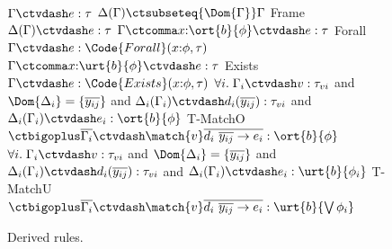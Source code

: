 \begin{figure}[h!]
{    \quad
    \mprooftr{22mm}
    {$\Gamma \ctvdash e : \tau$ \quad $\Delta(\Gamma) \ctsubseteq{\Dom{\Gamma}} \Gamma $}
    {Frame}
    {$\Delta(\Gamma) \ctvdash e : \tau$}
    \quad
    \mprooftr{35mm}
    {$\Gamma \ctcomma x{:}\ort{b}{\phi} \ctvdash e : \tau$}
    {Forall}
    {$\Gamma \ctvdash e : \Code{Forall}(x{:}\phi, \tau)$}
    \\[.8em]
    \mprooftr{35mm}
    {$\Gamma \ctcomma x{:}\urt{b}{\phi} \ctvdash e : \tau$}
    {Exists}
    {$\Gamma \ctvdash e : \Code{Exists}(x{:}\phi, \tau)$}
    \quad
    \mprooftr{65mm}
    {$\forall i.\;\Gamma_i \ctvdash v : \tau_{vi}$  and $\Dom{\Delta_i} = \{\overline{y_{ij}}\}$ and  $\Delta_i(\Gamma_i) \ctvdash d_i(\overline{y_{ij}}) : \tau_{vi}$ and $\Delta_i(\Gamma_i) \ctvdash e_i : \ort{b}{\phi}$ }
      {T-MatchO}
      {$\ctbigoplus \overline{\Gamma_i} \ctvdash \match{v} \overline{d_i\ \overline{y_{ij}} \to e_i}  : \ort{b}{\phi}$}
      \\[.8em]
    \mprooftr{65mm}
      {$\forall i.\;\Gamma_i \ctvdash v : \tau_{vi}$  and $\Dom{\Delta_i} = \{\overline{y_{ij}}\}$ and  $\Delta_i(\Gamma_i) \ctvdash d_i(\overline{y_{ij}}) : \tau_{vi}$ and $\Delta_i(\Gamma_i) \ctvdash e_i : \urt{b}{\phi_i}$ }
      {T-MatchU}
      {$\ctbigoplus \overline{\Gamma_i} \ctvdash \match{v} \overline{d_i\ \overline{y_{ij}} \to e_i}  : \urt{b}{\bigvee \phi_i}$}
    }
        \caption{Derived rules.}
    \label{fig:declaritive-typing-rules}
    \vspace*{-.1in}
    \end{figure}

